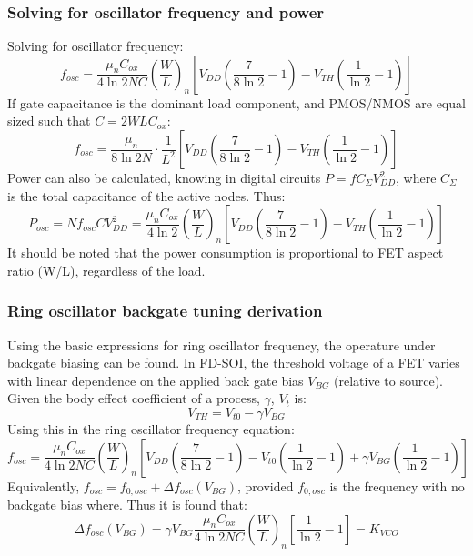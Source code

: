 		\subsubsection{Solving for oscillator frequency and power}
			Solving for oscillator frequency:
			\begin{equation}
				f_{osc} = \frac{\mu_nC_{ox}}{4\ln2NC}\left(\frac{W}{L}\right)_n\left[V_{DD}\left(\frac{7}{8\ln2}-1\right)-V_{TH}\left(\frac{1}{\ln2}-1\right) \right]
			\end{equation}
			If gate capacitance is the dominant load component, and PMOS/NMOS are equal sized such that $C=2WLC_{ox}$:
			\begin{equation}
				f_{osc} = \frac{\mu_n}{8\ln2N}\cdot\frac{1}{L^2}\left[V_{DD}\left(\frac{7}{8\ln2}-1\right)-V_{TH}\left(\frac{1}{\ln2}-1\right) \right]
			\end{equation}
			Power can also be calculated, knowing in digital circuits $P = fC_{\Sigma}V_{DD}^2$, where $C_{\Sigma}$ is the total capacitance of the active nodes. Thus:
			\begin{equation}
				P_{osc} = Nf_{osc}CV_{DD}^2 = \frac{\mu_nC_{ox}}{4\ln2}\left(\frac{W}{L}\right)_n\left[V_{DD}\left(\frac{7}{8\ln2}-1\right)-V_{TH}\left(\frac{1}{\ln2}-1\right) \right]
			\end{equation}
			It should be noted that the power consumption is proportional to FET aspect ratio (W/L), regardless of the load.

	\subsubsection{Ring oscillator backgate tuning derivation}
		Using the basic expressions for ring oscillator frequency, the operature under backgate biasing can be found. In FD-SOI, the threshold voltage of a FET varies with linear dependence on the applied back gate bias $V_{BG}$ (relative to source). Given the body effect coefficient of a process, $\gamma$, $V_t$ is:
		\begin{equation}
			V_{TH} = V_{t0} - \gamma V_{BG}
		\end{equation}
		Using this in the ring oscillator frequency equation:
		\begin{equation}
			f_{osc} = \frac{\mu_nC_{ox}}{4\ln2NC}\left(\frac{W}{L}\right)_n\left[V_{DD}\left(\frac{7}{8\ln2}-1\right)-V_{t0}\left(\frac{1}{\ln2}-1\right) + \gamma V_{BG}\left(\frac{1}{\ln2}-1\right) \right]
		\end{equation}
		Equivalently, $f_{osc} = f_{0,osc} + \Delta f_{osc}(V_{BG})$, provided $f_{0,osc}$ is the frequency with no backgate bias where. Thus it is found that:
		\begin{equation}\label{eq:kvco_}
			\Delta f_{osc}(V_{BG}) = \gamma V_{BG}\frac{\mu_nC_{ox}}{4\ln2NC}\left(\frac{W}{L}\right)_n\left[\frac{1}{\ln2}-1\right] = K_{VCO}
		\end{equation}	

